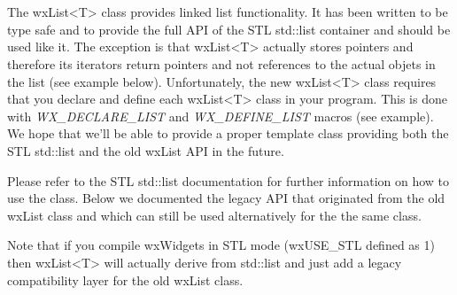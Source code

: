 
\section{}\label{wxlist}

The wxList<T> class provides linked list functionality. It has been written
to be type safe and to provide the full API of the STL std::list container and
should be used like it. The exception is that wxList<T> actually stores
pointers and therefore its iterators return pointers and not references
to the actual objets in the list (see example below). Unfortunately, the
new wxList<T> class requires that you declare and define each wxList<T>
class in your program. This is done with {\it WX\_DECLARE\_LIST} and 
{\it WX\_DEFINE\_LIST} macros (see example). We hope that we'll be able
to provide a proper template class providing both the STL std::list
and the old wxList API in the future.

Please refer to the STL std::list documentation for further
information on how to use the class. Below we documented the legacy
API that originated from the old wxList class and which can still 
be used alternatively for the the same class.

Note that if you compile wxWidgets in STL mode (wxUSE_STL defined as 1) 
then wxList<T> will actually derive from std::list and just add a legacy 
compatibility layer for the old wxList class.


